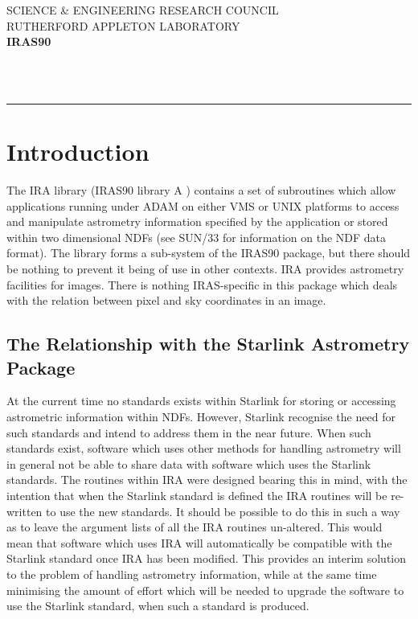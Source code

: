 

\thispagestyle{empty}
SCIENCE \& ENGINEERING RESEARCH COUNCIL \hfill \irasdocname\\
RUTHERFORD APPLETON LABORATORY\\
{\large\bf IRAS90\\}
{\large\bf \irasdoccategory\ \irasdocnumber}
\begin{flushright}
\irasdocauthors\\
\irasdocdate
\end{flushright}
\vspace{-4mm}
\rule{\textwidth}{0.5mm}
\vspace{5mm}
\begin{center}
{\Large\bf \irasdoctitle}
\end{center}
\vspace{5mm}
\setlength{\parskip}{0mm}
\tableofcontents
\setlength{\parskip}{\medskipamount}
\markright{\irasdocname}

\section {Introduction}
The IRA library (IRAS90 library A ) contains a set of subroutines which allow
applications running under ADAM on either VMS or UNIX platforms to access and
manipulate astrometry information specified by the application or stored within
two dimensional NDFs (see SUN/33 for information on the NDF data format). The
library forms a sub-system of the IRAS90 package, but there should be nothing to
prevent it being of use in other contexts. IRA provides astrometry facilities
for images. There is nothing IRAS-specific in this package which deals with the
relation between pixel and sky coordinates in an image.

\subsection { The Relationship with the Starlink Astrometry Package}
At the current time no standards exists within Starlink for storing or accessing
astrometric information within NDFs. However, Starlink recognise the need for
such standards and intend to address them in the near future. When such
standards exist, software which uses other methods for handling astrometry will
in general not be able to share data with software which uses the Starlink
standards. The routines within IRA were designed bearing this in mind, with the
intention that when the Starlink standard is defined the IRA routines will be
re-written to use the new standards. It should be possible to do this in such a
way as to leave the argument lists of all the IRA routines un-altered. This
would mean that software which uses IRA will automatically be compatible with
the Starlink standard once IRA has been modified. This provides an interim
solution to the problem of handling astrometry information, while at the same
time minimising the amount of effort which will be needed to upgrade the
software to use the Starlink standard, when such a standard is produced.

